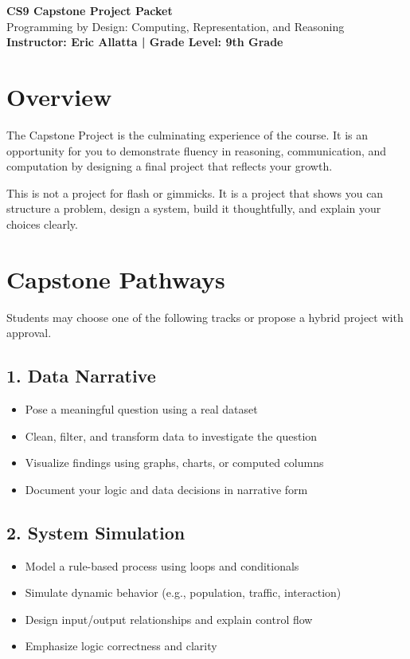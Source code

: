 \documentclass[11pt]{article}
\begin{document}
\begin{center}
  {\LARGE \textbf{CS9 Capstone Project Packet}} \\[0.25em]
  {\large Programming by Design: Computing, Representation, and Reasoning} \\[0.5em]
  \textbf{Instructor: Eric Allatta \quad | \quad Grade Level: 9th Grade}
\end{center}

\section*{Overview}
The Capstone Project is the culminating experience of the course. It is an opportunity for you to demonstrate fluency in reasoning, communication, and computation by designing a final project that reflects your growth.

This is not a project for flash or gimmicks. It is a project that shows you can structure a problem, design a system, build it thoughtfully, and explain your choices clearly.

\section*{Capstone Pathways}
Students may choose one of the following tracks or propose a hybrid project with approval.

\subsection*{1. Data Narrative}
\begin{itemize}[leftmargin=*]
  \item Pose a meaningful question using a real dataset
  \item Clean, filter, and transform data to investigate the question
  \item Visualize findings using graphs, charts, or computed columns
  \item Document your logic and data decisions in narrative form
\end{itemize}

\subsection*{2. System Simulation}
\begin{itemize}[leftmargin=*]
  \item Model a rule-based process using loops and conditionals
  \item Simulate dynamic behavior (e.g., population, traffic, interaction)
  \item Design input/output relationships and explain control flow
  \item Emphasize logic correctness and clarity
\end{itemize}
\end{document}
